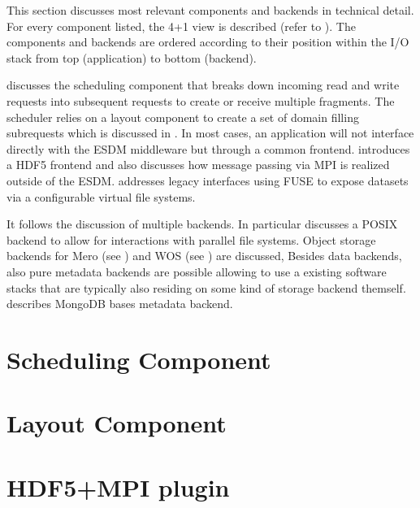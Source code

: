
\begin{chapterIntro}
	This section discusses most relevant components and backends in technical detail.
	For every component listed, the 4+1 view is described (refer to ).
	The components and backends are ordered according to their position within the I/O stack from top (application) to bottom (backend).

	 discusses the scheduling component that breaks down incoming read and write requests into subsequent requests to create or receive multiple fragments.
	The scheduler relies on a layout component to create a set of domain filling subrequests which is discussed in .
	In most cases, an application will not interface directly with the ESDM middleware but through a common frontend.
	 introduces a HDF5 frontend and also discusses how message passing via MPI is realized outside of the ESDM.
	 addresses legacy interfaces using FUSE to expose datasets via a configurable virtual file systems.

	It follows the discussion of multiple backends.
	In particular  discusses a POSIX backend to allow for interactions with parallel file systems.
	Object storage backends for Mero (see ) and WOS (see ) are discussed,
	Besides data backends, also pure metadata backends are possible allowing to use a existing software stacks that are typically also residing on some kind of storage backend themself.
	 describes MongoDB bases metadata backend.
\end{chapterIntro}



\section{Scheduling Component}
\label{component: scheduler}


\clearpage
\section{Layout Component}
\label{component: layout}




\clearpage
\section{HDF5+MPI plugin}
\label{frontend: hdf5 + mpi}



